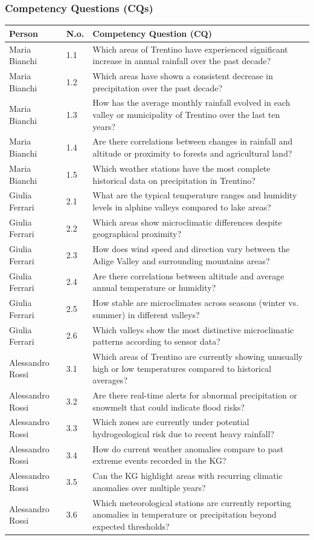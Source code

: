 \subsubsection{Competency Questions (CQs)}
\begin{tabular}{|p{5cm}|p{1cm}|p{10cm}|}
\hline
\textbf{Person} & \textbf{N.o.} & \textbf{Competency Question (CQ)} \\
\hline
Maria Bianchi & 1.1 & Which areas of Trentino have experienced significant increase in annual rainfall over the past decade? \\ Maria Bianchi & 1.2 & Which areas have shown a consistent decrease in precipitation over the past decade? \\ Maria Bianchi & 1.3 & How has the average monthly rainfall evolved in each valley or municipality of Trentino over the last ten years? \\ Maria Bianchi & 1.4 & Are there correlations between changes in rainfall and altitude or proximity to forests and agricultural land?\\ Maria Bianchi & 1.5 & Which weather stations have the most complete historical data on precipitation in Trentino? \\
\hline
Giulia Ferrari & 2.1 & What are the typical temperature ranges and humidity levels in alphine valleys compared to lake areas? \\ Giulia Ferrari & 2.2 & Which areas show microclimatic differences despite geographical proximity? \\ Giulia Ferrari & 2.3 & How does wind speed and direction vary between the Adige Valley and surrounding mountains areas? \\ Giulia Ferrari & 2.4 & Are there correlations between altitude and average annual temperature or humidity? \\ Giulia Ferrari & 2.5 & How stable are microclimates across seasons (winter vs. summer) in different valleys? \\ Giulia Ferrari & 2.6 & Which valleys show the most distinctive microclimatic patterns according to sensor data? \\
\hline
Alessandro Rossi & 3.1 & Which areas of Trentino are currently showing unusually high or low temperatures compared to historical averages? \\ Alessandro Rossi & 3.2 & Are there real-time alerts for abnormal precipitation or snowmelt that could indicate flood risks? \\ Alessandro Rossi & 3.3 & Which zones are currently under potential hydrogeological risk due to recent heavy rainfall? \\ Alessandro Rossi & 3.4 & How do current weather anomalies compare to past extreme events recorded in the KG? \\ Alessandro Rossi & 3.5 & Can the KG highlight areas with recurring climatic anomalies over multiple years? \\ Alessandro Rossi & 3.6 & Which meteorological stations are currently reporting anomalies in temperature or precipitation beyond expected thresholds?\\

\end{tabular}
